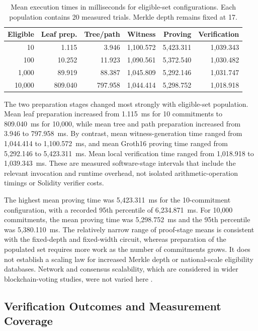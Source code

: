 \begin{table}[t]
\centering
\caption{Mean execution times in milliseconds
for eligible-set configurations.
Each population contains 20 measured trials.
Merkle depth remains fixed at 17.}
\label{tab:results-eligible-set}
\scriptsize
\setlength{\tabcolsep}{4pt}
\begin{tabular}{@{}rrrrrr@{}}
\toprule
\textbf{Eligible} &
\textbf{Leaf prep.} &
\textbf{Tree/path} &
\textbf{Witness} &
\textbf{Proving} &
\textbf{Verification} \\
\midrule
10
& 1.115
& 3.946
& 1,100.572
& 5,423.311
& 1,039.343 \\
100
& 10.252
& 11.923
& 1,090.561
& 5,372.540
& 1,030.482 \\
1,000
& 89.919
& 88.387
& 1,045.809
& 5,292.146
& 1,031.747 \\
10,000
& 809.040
& 797.958
& 1,044.414
& 5,298.752
& 1,018.918 \\
\bottomrule
\end{tabular}
\end{table}

The two preparation stages changed most strongly with eligible-set population. Mean leaf preparation increased from 1.115~ms for 10 commitments to 809.040~ms for 10,000, while mean tree and path preparation increased from 3.946 to 797.958~ms. By contrast, mean witness-generation time ranged from 1,044.414 to 1,100.572~ms, and mean Groth16 proving time ranged from 5,292.146 to 5,423.311~ms. Mean local verification time ranged from 1,018.918 to 1,039.343~ms. These are measured software-stage intervals that include the relevant invocation and runtime overhead, not isolated arithmetic-operation timings or Solidity verifier costs.

The highest mean proving time was 5,423.311~ms for the 10-commitment configuration, with a recorded 95th percentile of 6,234.871~ms. For 10,000 commitments, the mean proving time was 5,298.752~ms and the 95th percentile was 5,380.110~ms. The relatively narrow range of proof-stage means is consistent with the fixed-depth and fixed-width circuit, whereas preparation of the populated set requires more work as the number of commitments grows. It does not establish a scaling law for increased Merkle depth or national-scale eligibility databases. Network and consensus scalability, which are considered in wider blockchain-voting studies, were not varied here \citep{jafar2022scalability,indrason2025mbcsd}.

\subsection{Verification Outcomes and Measurement Coverage}
\label{subsec:results-verification}

